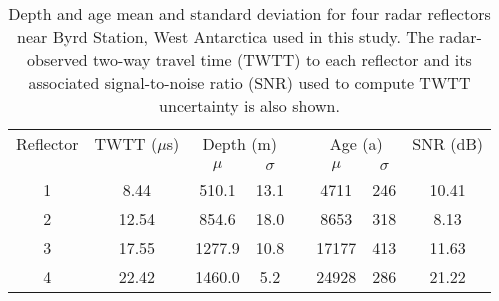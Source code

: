 \documentclass[draft,jgrga]{statclim}
\begin{document}
 \begin{table}
 \centering
 \caption{  Depth and age mean and standard deviation for four radar reflectors near Byrd Station, West Antarctica used in this study. The radar-observed two-way travel time (TWTT) to each reflector and its associated signal-to-noise ratio (SNR) used to compute TWTT uncertainty is also shown.}
 \begin{tabular}{ c c c c c c c c}
Reflector & TWTT ($\mu$s)&  \multicolumn{2}{c}{Depth (m)} &  & \multicolumn{2}{c}{Age  (a)} & SNR  (dB) \\   
 \cline{3-4} \cline{6-7}
 & & $\mu$  & $\sigma$ & & $\mu$  & $\sigma$ &\\
  \cline{1-8}
  1 & 8.44    & 510.1  &  13.1 & & 4711 & 246  & 10.41\\
  2 & 12.54   & 854.6 &  18.0 & & 8653 & 318  & 8.13 \\
  3 & 17.55   & 1277.9 &  10.8 & & 17177 & 413  & 11.63\\
  4 & 22.42   & 1460.0 &  5.2 & & 24928 & 286 & 21.22 \\
 \end{tabular}

 \label{tab:depthunc}
\end{table}
\end{document}

